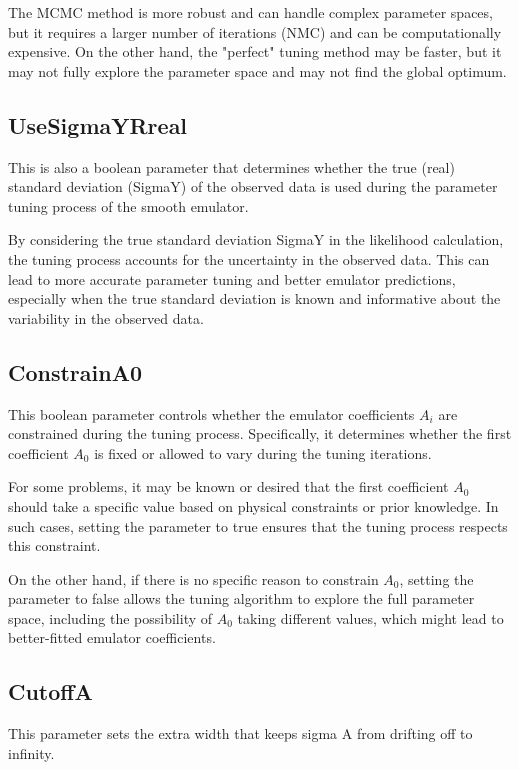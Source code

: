 \documentclass[12pt]{article}
\numberwithin{equation}{section}
\numberwithin{figure}{section}
\begin{document}
The MCMC method is more robust and can handle complex parameter spaces, but it requires a larger number of iterations (NMC) and can be computationally expensive. On the other hand, the "perfect" tuning method may be faster, but it may not fully explore the parameter space and may not find the global optimum. \\



\subsection{UseSigmaYRreal}  

This is also a boolean parameter that determines whether the true (real) standard deviation (SigmaY) of the observed data is used during the parameter tuning process of the smooth emulator.

By considering the true standard deviation SigmaY in the likelihood calculation, the tuning process accounts for the uncertainty in the observed data. This can lead to more accurate parameter tuning and better emulator predictions, especially when the true standard deviation is known and informative about the variability in the observed data.



\subsection{ConstrainA0}
 This boolean parameter controls whether the emulator coefficients $A_i$ are constrained during the tuning process. Specifically, it determines whether the first coefficient $A_0$ is fixed or allowed to vary during the tuning iterations.  

For some problems, it may be known or desired that the first coefficient $A_0$ should take a specific value based on physical constraints or prior knowledge. In such cases, setting the parameter to true ensures that the tuning process respects this constraint.

On the other hand, if there is no specific reason to constrain $A_0$, setting the parameter to false allows the tuning algorithm to explore the full parameter space, including the possibility of $A_0$ taking different values, which might lead to better-fitted emulator coefficients.\\

\subsection{CutoffA}
This parameter sets the extra width that keeps sigma A from drifting off to infinity.  
\end{document}
